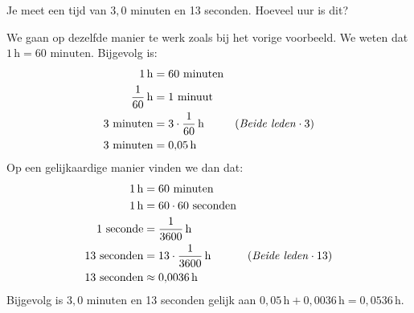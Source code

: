 \documentclass{ximera}
\begin{document}
\begin{example}[foldable=true,title={Voorbeeld: Minuten en seconden naar uur omzetten}]\nl
    Je meet een tijd van $3{,}0$ minuten en 13 seconden. Hoeveel uur is dit?

    \begin{solution}\nl
        We gaan op dezelfde manier te werk zoals bij het vorige voorbeeld. We weten dat $1 \, \mathrm{h} = 60 \text{ minuten}$. Bijgevolg is:
        \begin{align*}
        1 \, \mathrm{h} & = 60 \text{ minuten} \\
        \frac{1}{60} \, \mathrm{h} & = 1 \text{ minuut} \\
        3 \text{ minuten} & = 3 \cdot \frac{1}{60} \, \mathrm{h} & (\text{\textit{Beide leden}} \cdot 3) \\
        3 \text{ minuten} & = 0{,}05 \, \mathrm{h}
        \end{align*}
        Op een gelijkaardige manier vinden we dan dat:
        \begin{align*}
        1 \, \mathrm{h} & = 60 \text{ minuten} \\
        1 \, \mathrm{h} & = 60 \cdot 60 \text{ seconden} \\
        1 \text{ seconde} & = \frac{1}{3600} \, \mathrm{h} \\
        13 \text{ seconden} & = 13 \cdot \frac{1}{3600} \, \mathrm{h} & (\text{\textit{Beide leden}} \cdot 13) \\
        13 \text{ seconden} & \approx 0{,}0036 \, \mathrm{h}
        \end{align*}
        Bijgevolg is $3{,}0$ minuten en 13 seconden gelijk aan $0{,}05 \, \mathrm{h} + 0{,}0036 \, \mathrm{h} = 0{,}0536 \, \mathrm{h}$.
    \end{solution}
\end{example}
\end{document}
